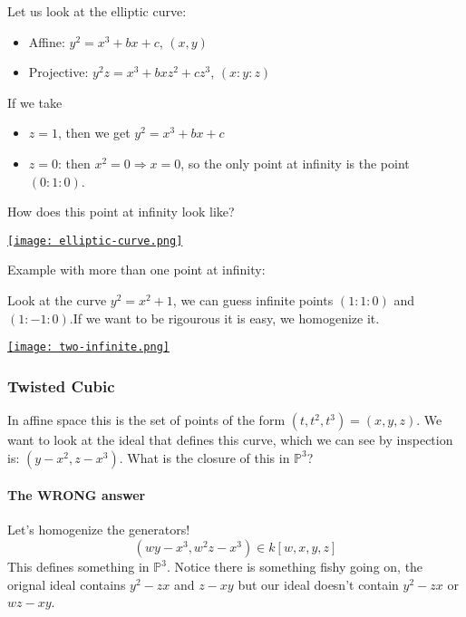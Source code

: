 \begin{example}
    Let us look at the elliptic curve:\begin{itemize}
        \item Affine: $y^2 = x^3 + bx+c$, $(x,y)$
        \item Projective: $y^2z = x^3+bxz^2+cz^3$, $(x\colon y\colon z)$
    \end{itemize}

    If we take \begin{itemize}
        \item $z=1$, then we get $y^2 = x^3+bx+c$
        \item $z=0$: then $x^2 = 0\Rightarrow x = 0$, so the only point at infinity is the point $(0\colon 1\colon 0)$.
    \end{itemize}

    How does this point at infinity look like?

    \href{https://youtu.be/-znTMw_3mu0?t=1017}{\texttt{[image: elliptic-curve.png]}}
\end{example}

\begin{example}
    Example with more than one point at infinity:

    Look at the curve $y^2 = x^2+1$, we can guess infinite points $(1\colon 1\colon 0)$ and $(1\colon -1\colon 0)$.If we want to be rigourous it is easy, we homogenize it.

    \href{https://youtu.be/-znTMw_3mu0?t=1143}{\texttt{[image: two-infinite.png]}}
\end{example}

\subsubsection{Twisted Cubic}

In affine space this is the set of points of the form $(t,t^2,t^3) = (x,y,z)$. We want to look at the ideal that defines this curve, which we can see by inspection is: $(y-x^2, z-x^3)$. What is the closure of this in $\mathbb{P}^3$?

\paragraph*{The WRONG answer}

Let's homogenize the generators! \[(wy-x^3,w^2z-x^3)\in k[w,x,y,z]\] This defines something in $\mathbb{P}^3$. Notice there is something fishy going on, the orignal ideal contains $y^2 - zx$ and $z-xy$ but our ideal doesn't contain $y^2-zx$ or $wz-xy$.

